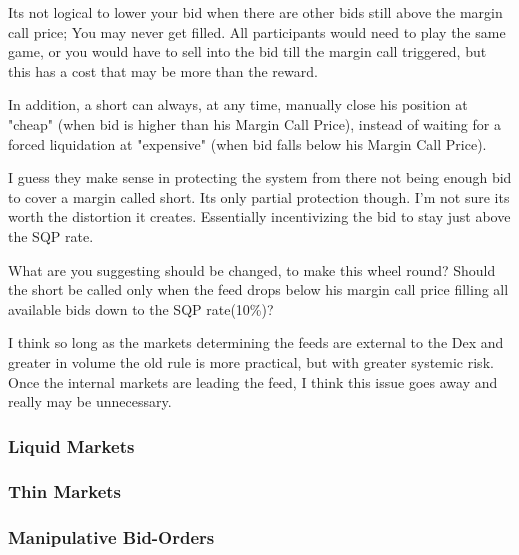 Its not logical to lower your bid when there are other bids still above the
margin call price; You may never get filled. All participants would need to
play the same game, or you would have to sell into the bid till the margin call
triggered, but this has a cost that may be more than the reward.

In addition, a short can always, at any time, manually close his position at
"cheap" (when bid is higher than his Margin Call Price), instead of waiting for
a forced liquidation at "expensive" (when bid falls below his Margin Call
Price).   

I guess they make sense in protecting the system from there
not being enough bid to cover a margin called short. Its only partial
protection though. I'm not sure its worth the distortion it creates.
Essentially incentivizing the bid to stay just above the SQP rate.

What are you suggesting should be changed, to make this wheel round?  Should
the short be called only when the feed drops below his margin call price
filling all available bids down to the SQP rate(10\%)?

I think so long as the markets determining the feeds are external to the Dex
and greater in volume the old rule is more practical, but with greater systemic
risk. Once the internal markets are leading the feed, I think this issue goes
away and really may be unnecessary.
\subsubsection{Liquid Markets}
\subsubsection{Thin Markets}
\subsubsection{Manipulative Bid-Orders}
